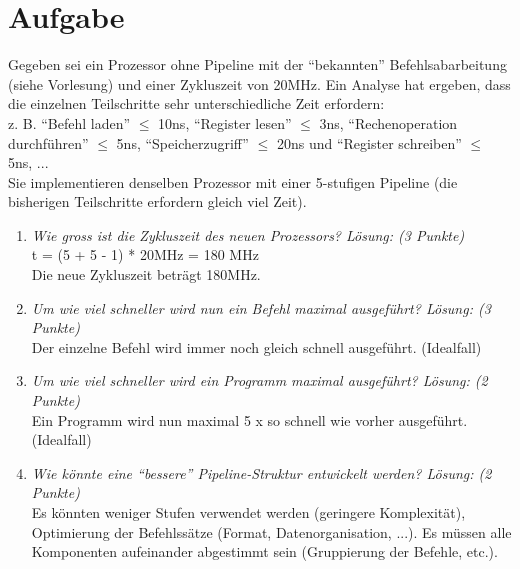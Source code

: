 \documentclass[10pt]{article}
\begin{document}
\section{Aufgabe}
Gegeben sei ein Prozessor ohne Pipeline mit der "`bekannten"' Befehlsabarbeitung (siehe Vorlesung) und einer Zykluszeit von 20MHz. Ein Analyse hat ergeben, dass die einzelnen Teilschritte sehr unterschiedliche Zeit erfordern:\\
z. B. "`Befehl laden"' $\leq$ 10ns, "`Register lesen"' $\leq$ 3ns, "`Rechenoperation durchführen"' $\leq$ 5ns, "`Speicherzugriff"' $\leq$ 20ns und "`Register schreiben"' $\leq$ 5ns, ... \\
Sie implementieren denselben Prozessor mit einer 5-stufigen Pipeline (die bisherigen Teilschritte erfordern gleich viel Zeit). 
\begin{enumerate}[label=\alph*)]
	\item 
	\textit{Wie gross ist die Zykluszeit des neuen Prozessors? Lösung: (3 Punkte) } \\
	
	
	t = (5 + 5 - 1) * 20MHz = 180 MHz \\
	Die neue Zykluszeit beträgt	180MHz.\\ %

	\item 
	\textit{Um wie viel schneller wird nun ein Befehl maximal ausgeführt? Lösung: (3 Punkte)} \\
	Der einzelne Befehl wird immer noch gleich schnell ausgeführt. (Idealfall)	
	\item 
	\textit{Um wie viel schneller wird ein Programm maximal ausgeführt? Lösung: (2 Punkte) } \\
	Ein Programm wird nun maximal 5 x so schnell wie vorher ausgeführt. (Idealfall)
	\item 
	\textit{Wie	könnte eine "`bessere"' Pipeline-Struktur entwickelt werden? Lösung: (2 Punkte)  } \\
	Es könnten weniger Stufen verwendet werden (geringere Komplexität), Optimierung der Befehlssätze (Format, Datenorganisation, ...). Es müssen alle Komponenten aufeinander abgestimmt sein (Gruppierung der Befehle, etc.).
\end{enumerate}
\end{document}

